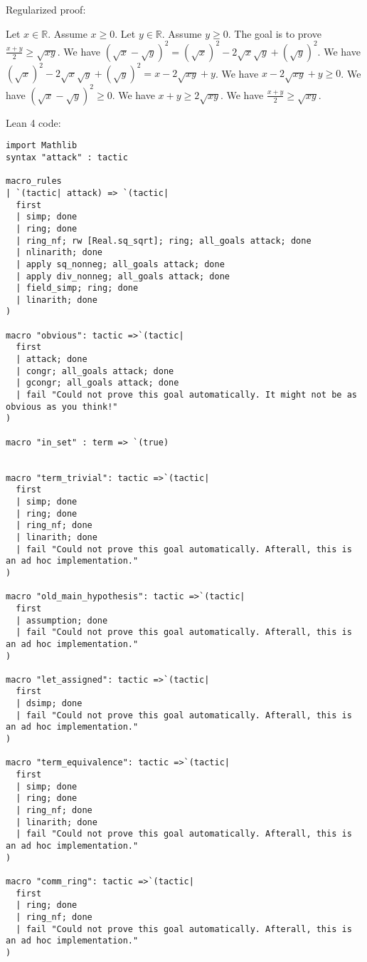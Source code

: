 \documentclass{article}
\begin{document}
Regularized proof:
\begin{tcolorbox}[colback=red!10, width=\linewidth]
Let $x\in\mathbb{R}$. Assume $x\ge 0$.
Let $y\in\mathbb{R}$. Assume $y\ge 0$.
The goal is to prove $\frac{x+y}{2} \ge \sqrt{xy}$.
We have ${{(\sqrt x - \sqrt y)}}^2 = {{(\sqrt x)}}^2 - 2\sqrt x \sqrt y + {{(\sqrt y)}}^2$.
We have ${{(\sqrt x)}}^2 - 2\sqrt x \sqrt y + {{(\sqrt y)}}^2 = x - 2\sqrt{xy} + y$.
We have $x - 2\sqrt{xy} + y \ge 0$.
We have ${{(\sqrt x - \sqrt y)}}^2 \ge 0$.
We have $x + y \ge 2\sqrt{xy}$.
We have $\frac{x+y}{2} \ge \sqrt{xy}$.
\end{tcolorbox}

Lean 4 code:
\begin{tcolorbox}[colback=white!10, width=\linewidth]
\begin{lstlisting}[language=Lean4]
import Mathlib
syntax "attack" : tactic

macro_rules
| `(tactic| attack) => `(tactic|
  first
  | simp; done
  | ring; done
  | ring_nf; rw [Real.sq_sqrt]; ring; all_goals attack; done
  | nlinarith; done
  | apply sq_nonneg; all_goals attack; done
  | apply div_nonneg; all_goals attack; done
  | field_simp; ring; done
  | linarith; done
)

macro "obvious": tactic =>`(tactic|
  first
  | attack; done
  | congr; all_goals attack; done
  | gcongr; all_goals attack; done
  | fail "Could not prove this goal automatically. It might not be as obvious as you think!"
)

macro "in_set" : term => `(true)


macro "term_trivial": tactic =>`(tactic|
  first
  | simp; done
  | ring; done
  | ring_nf; done
  | linarith; done
  | fail "Could not prove this goal automatically. Afterall, this is an ad hoc implementation."
)

macro "old_main_hypothesis": tactic =>`(tactic|
  first
  | assumption; done
  | fail "Could not prove this goal automatically. Afterall, this is an ad hoc implementation."
)

macro "let_assigned": tactic =>`(tactic|
  first
  | dsimp; done
  | fail "Could not prove this goal automatically. Afterall, this is an ad hoc implementation."
)

macro "term_equivalence": tactic =>`(tactic|
  first
  | simp; done
  | ring; done
  | ring_nf; done
  | linarith; done
  | fail "Could not prove this goal automatically. Afterall, this is an ad hoc implementation."
)

macro "comm_ring": tactic =>`(tactic|
  first
  | ring; done
  | ring_nf; done
  | fail "Could not prove this goal automatically. Afterall, this is an ad hoc implementation."
)


\end{lstlisting}
\end{tcolorbox}
\end{document}
